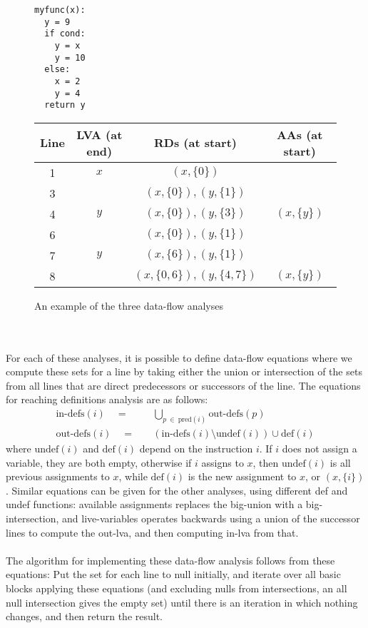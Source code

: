 \documentclass[12pt,twoside,notitlepage]{report}
\begin{document}
\begin{figure}[h]
	\begin{minipage}{0.3\linewidth}
	\begin{verbatim}
myfunc(x):
  y = 9
  if cond:
    y = x
    y = 10
  else:
    x = 2
    y = 4
  return y
	\end{verbatim}
	\end{minipage}
	\begin{minipage}{0.7\linewidth}
		\begin{center}
			\begin{tabular}{|c|c|c|c|}
				\hline
				Line & LVA (at end) & RDs (at start) & AAs (at start) \\
				\hline
				1 & $x$ & $(x, \{0\})$ & \\
				\hline
				3 & & $(x, \{0\}), (y, \{1\})$ & \\
				4 & $y$ & $(x, \{0\}), (y, \{3\})$ & $(x, \{y\})$ \\
				\hline
				6 & & $(x, \{0\}), (y, \{1\})$ & \\
				7 & $y$ & $(x, \{6\}), (y, \{1\})$ & \\
				\hline
				8 & & $(x, \{0, 6\}), (y, \{4, 7\})$ & $(x, \{y\})$ \\
				\hline
			\end{tabular}
		\end{center}
	\end{minipage}
	\caption{An example of the three data-flow analyses}
	\label{fig:dataflow}
\end{figure}
\\\\
For each of these analyses, it is possible to define data-flow equations where we compute these sets for a line by taking either the union or intersection of the sets from all lines that are direct predecessors or successors of the line. The equations for reaching definitions analysis are as follows:
\begin{align*}
\text{in-defs}(i) \quad=&\quad \bigcup_{p\ \in\ \text{pred}(i)} \text{out-defs}(p) \\
\text{out-defs}(i) \quad=&\quad (\text{in-defs}(i) \setminus \text{undef}(i)) \cup \text{def}(i)
\end{align*}
where $\text{undef}(i)$ and $\text{def}(i)$ depend on the instruction $i$. If $i$ does not assign a variable, they are both empty, otherwise if $i$ assigns to $x$, then $\text{undef}(i)$ is all previous assignments to $x$, while $\text{def}(i)$ is the new assignment to $x$, or $(x, \{i\})$. Similar equations can be given for the other analyses, using different def and undef functions: available assignments replaces the big-union with a big-intersection, and live-variables operates backwards using a union of the successor lines to compute the out-lva, and then computing in-lva from that.
\\\\
The algorithm for implementing these data-flow analysis follows from these equations: Put the set for each line to null initially, and iterate over all basic blocks applying these equations (and excluding nulls from intersections, an all null intersection gives the empty set) until there is an iteration in which nothing changes, and then return the result.
\end{document}
